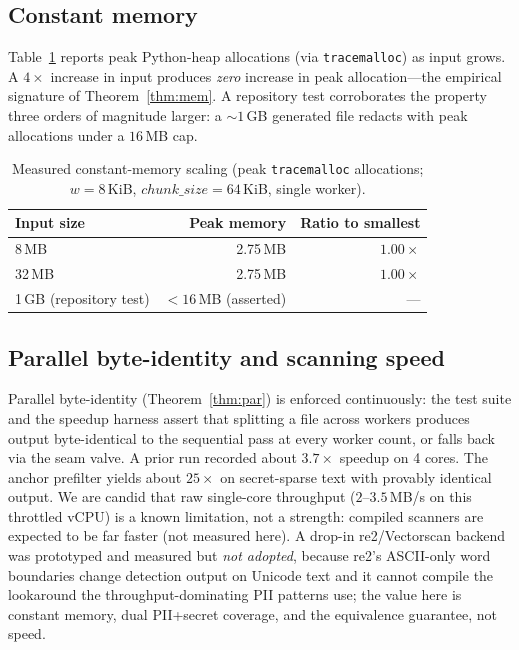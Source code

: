 \documentclass[runningheads]{llncs}
\begin{document}
\subsection{Constant memory}
Table~\ref{tab:memory} reports peak Python-heap allocations (via
\texttt{tracemalloc}) as input grows. A $4\times$ increase in input produces
\emph{zero} increase in peak allocation---the empirical signature of
Theorem~\ref{thm:mem}. A repository test corroborates the property three orders
of magnitude larger: a $\sim\!1$\,GB generated file redacts with peak allocations
under a $16$\,MB cap.

\begin{table}[t]
\centering
\caption{Measured constant-memory scaling (peak \texttt{tracemalloc}
allocations; $w=8$\,KiB, $\mathit{chunk\_size}=64$\,KiB, single worker).}
\label{tab:memory}
\begin{tabular}{@{}lrr@{}}
\toprule
Input size & Peak memory & Ratio to smallest \\
\midrule
8\,MB  & 2.75\,MB & $1.00\times$ \\
32\,MB & 2.75\,MB & $1.00\times$ \\
1\,GB (repository test) & $<16$\,MB (asserted) & --- \\
\bottomrule
\end{tabular}
\end{table}

\subsection{Parallel byte-identity and scanning speed}
Parallel byte-identity (Theorem~\ref{thm:par}) is enforced continuously: the
test suite and the speedup harness assert that splitting a file across workers
produces output byte-identical to the sequential pass at every worker count, or
falls back via the seam valve. A prior run recorded about $3.7\times$ speedup on
4 cores. The anchor prefilter yields about $25\times$ on secret-sparse text with
provably identical output. We are candid that raw single-core throughput
($2$--$3.5$\,MB/s on this throttled vCPU) is a known limitation, not a strength:
compiled scanners are expected to be far faster (not measured here). A drop-in re2/Vectorscan
backend was prototyped and measured but \emph{not adopted}, because re2's
ASCII-only word boundaries change detection output on Unicode text and it cannot
compile the lookaround the throughput-dominating PII patterns use; the value here
is constant memory, dual PII+secret coverage, and the equivalence guarantee,
not speed.
\end{document}
